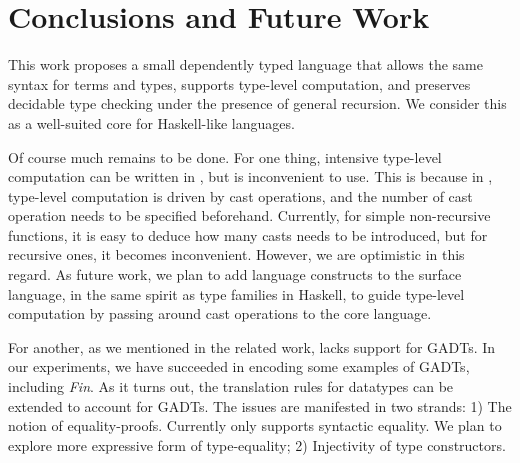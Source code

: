 \section{Conclusions and Future Work}

This work proposes a small dependently typed language that allows the
same syntax for terms and types, supports type-level computation, and
preserves decidable type checking under the presence of general
recursion. We consider this as a well-suited core for Haskell-like
languages.

Of course much remains to be done. For one thing, intensive type-level
computation can be written in \name, but is inconvenient to use. This
is because in \name, type-level computation is driven by cast
operations, and the number of cast operation needs to be specified
beforehand. Currently, for simple non-recursive functions, it is easy
to deduce how many casts needs to be introduced, but for recursive
ones, it becomes inconvenient. However, we are optimistic in this
regard. As future work, we plan to add language constructs to the
surface language, in the same spirit as type families in Haskell, to
guide type-level computation by passing around cast operations to the
core language.

For another, as we mentioned in the related work, \name lacks support
for GADTs. In our experiments, we have succeeded in encoding some
examples of GADTs, including \emph{Fin}. As it turns out, the
translation rules for datatypes can be extended to account for
GADTs. The issues are manifested in two strands: 1) The notion of
equality-proofs. Currently \name only supports syntactic equality. We
plan to explore more expressive form of type-equality; 2) Injectivity
of type constructors. 
